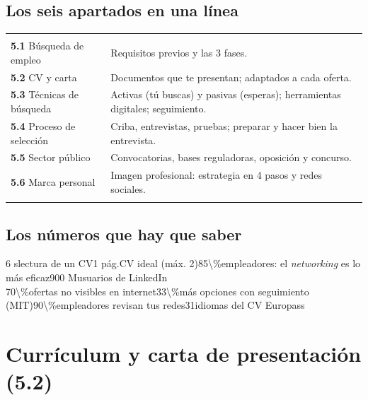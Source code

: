\subsection*{Los seis apartados en una línea}
\begin{tabla}
\begin{tabularx}{\textwidth}{@{}l Y@{}}
 &  \\
\midrule
\textbf{5.1} Búsqueda de empleo & Requisitos previos y las 3 fases. \\
\textbf{5.2} CV y carta & Documentos que te presentan; adaptados a cada oferta. \\
\textbf{5.3} Técnicas de búsqueda & Activas (tú buscas) y pasivas (esperas); herramientas digitales; seguimiento. \\
\textbf{5.4} Proceso de selección & Criba, entrevistas, pruebas; preparar y hacer bien la entrevista. \\
\textbf{5.5} Sector público & Convocatorias, bases reguladoras, oposición y concurso. \\
\textbf{5.6} Marca personal & Imagen profesional: estrategia en 4 pasos y redes sociales. \\
\bottomrule
\end{tabularx}
\end{tabla}

\subsection*{Los números que hay que saber}
\begin{center}
\num{6 s}{lectura de un CV}\hfill\num{1 pág.}{CV ideal (máx. 2)}\hfill\num{85\%}{empleadores: el \emph{networking} es lo más eficaz}\hfill\num{900 M}{usuarios de LinkedIn}\\[10pt]
\num{70\%}{ofertas no visibles en internet}\hfill\num{33\%}{más opciones con seguimiento (MIT)}\hfill\num{90\%}{empleadores revisan tus redes}\hfill\num{31}{idiomas del CV Europass}
\end{center}

\clearpage\section{Currículum y carta de presentación (5.2)}
